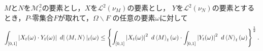 	\begin{sketch}
		
	\end{sketch}
	
	\begin{comment}
	いま，$\mathscr{P}_{\mathbf{T}}$の要素に対する定義関数の全体の線型包を$\mathscr{S}$と定める:
	\begin{align}
		\mathscr{S} \defeq \operatorname{Span}\Set{\defunc_A}{A \in \mathscr{P}_{\mathbf{T}}}.
	\end{align}
	このとき$\mathscr{S}$は$\mathscr{L}^2(\nu_M)$において，セミノルム$\Norm{\cdot}{\mathscr{L}^2(\nu_M)}$に関して稠密となる．
	
	\begin{screen}
		\begin{thm}
			
		\end{thm}
	\end{screen}
	\end{comment}
	
	\begin{screen}
		\begin{thm}[確立積分に対するヘルダーの不等式]
			$M$と$N$を$\mathscr{M}_{c}^{2}$の要素とし，$X$を$\mathscr{L}^{2}(\nu_{M})$の要素とし，
			$Y$を$\mathscr{L}^{2}(\nu_{N})$の要素とするとき，$P$-零集合$F$が取れて，$\Omega \backslash F$
			の任意の要素$\omega$に対して
			\begin{align}
				\int_{[0,1]} \left|X_{t}(\omega) \cdot Y_{t}(\omega)\right|\ d|\inprod<M,N>|_{t}(\omega)
				\leq \left\{\int_{[0,1]} \left|X_{t}(\omega)\right|^{2}\ d\inprod<M>_{t}(\omega)
				\cdot \int_{[0,1]} \left|Y_{t}(\omega)\right|^{2}\ d\inprod<N>_{t}(\omega)
				\right\}^{\frac{1}{2}}.
			\end{align}
		\end{thm}
	\end{screen}
	
